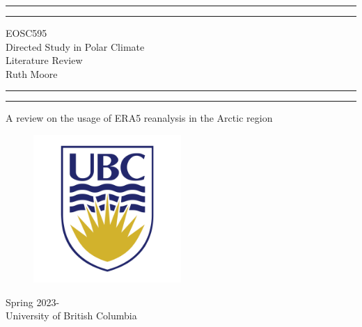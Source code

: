 \documentclass[12pt, oneside]{article}
\begin{document}





\begin{titlepage}
    \centering 
	\scshape
	\vspace*{2\baselineskip}
	\rule{\textwidth}{1.6pt}\vspace*{-\baselineskip}\vspace*{2pt} 
	\rule{\textwidth}{0.4pt} 
	\vspace{0.75\baselineskip} 
	{\Huge EOSC595 \\ Directed Study in Polar Climate} \\
	\vspace{0.1in}
		{\Large Literature Review} \\
		\vspace{0.1in}
		{\Large Ruth Moore} \\
	\vspace{0.75\baselineskip} 
	\rule{\textwidth}{0.4pt}\vspace*{-\baselineskip}\vspace*{2pt} 
		\rule{\textwidth}{1.6pt}
	\vspace*{2\baselineskip} 

\Huge{A review on the usage of ERA5 reanalysis in the Arctic region}
\vspace{0.1in}	

\begin{figure}[hbtp]
\centering
\includegraphics[width=0.5\textwidth]{../ubc-logo-png-transparent.png}
\end{figure}
{\Large Spring 2023- } \\
	{\large University of British Columbia} 
\end{titlepage}
\pagestyle{fancy}


{
  \hypersetup{linkcolor=black}
  \tableofcontents
}
\end{document}
